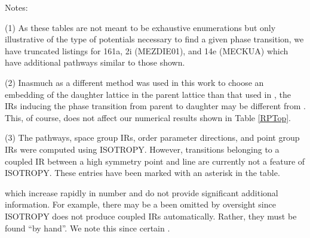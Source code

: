 \documentclass[preprint]{iucr}              %
\begin{document}
Notes: 

(1) As these tables are not meant to be exhaustive enumerations but only
illustrative of the type of potentials necessary to find a given phase
transition, we have truncated listings for 161a, 2i (MEZDIE01), and 14e (MECKUA)
which have additional pathways similar to those shown. 

(2) Inasmuch as a different method was used in this work to choose an embedding
of the daughter lattice in the parent lattice than that used in
\cite{McClurg09}, the IRs inducing the phase transition from parent to daughter
may be different from \cite{McClurg09}.  This, of course, does not affect our
numerical results shown in Table \ref{RPTop}.

(3)  The pathways, space group IRs, order parameter directions, and point group
IRs were computed using ISOTROPY.
However, transitions belonging to a coupled IR between a high symmetry point and
line
are currently not a feature of ISOTROPY.  These entries have been marked with an
asterisk in
the table.

which increase rapidly in number and do not provide significant additional
information. For example, there may be a %
been omitted by oversight since ISOTROPY does not produce coupled IRs
automatically.  Rather, they must be found ``by hand''.  We note this since
certain %
\cite{Stokes84}.
\end{document}
